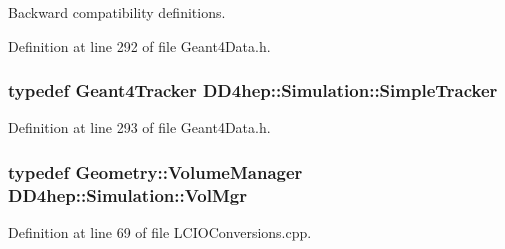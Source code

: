 Backward compatibility definitions. 

Definition at line 292 of file Geant4Data.h.\hypertarget{namespace_d_d4hep_1_1_simulation_aeac70046c56d692918ebee2e3cdd8c3f}{
\subsubsection[{SimpleTracker}]{\setlength{\rightskip}{0pt plus 5cm}typedef {\bf Geant4Tracker} {\bf DD4hep::Simulation::SimpleTracker}}}
\label{namespace_d_d4hep_1_1_simulation_aeac70046c56d692918ebee2e3cdd8c3f}


Definition at line 293 of file Geant4Data.h.\hypertarget{namespace_d_d4hep_1_1_simulation_a989cbf131f431a9856bcfd4ecd78c39f}{
\subsubsection[{VolMgr}]{\setlength{\rightskip}{0pt plus 5cm}typedef {\bf Geometry::VolumeManager} {\bf DD4hep::Simulation::VolMgr}}}
\label{namespace_d_d4hep_1_1_simulation_a989cbf131f431a9856bcfd4ecd78c39f}


Definition at line 69 of file LCIOConversions.cpp.

